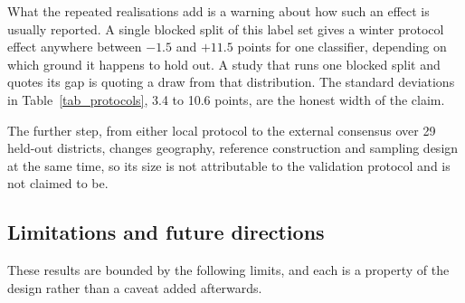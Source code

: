 \documentclass[conference]{IEEEtran}
\begin{document}
What the repeated realisations add is a warning about how such an effect is usually reported. A single blocked split of this label set gives a winter protocol effect anywhere between $-1.5$ and $+11.5$ points for one classifier, depending on which ground it happens to hold out. A study that runs one blocked split and quotes its gap is quoting a draw from that distribution. The standard deviations in Table~\ref{tab_protocols}, 3.4 to 10.6 points, are the honest width of the claim.

The further step, from either local protocol to the external consensus over 29 held-out districts, changes geography, reference construction and sampling design at the same time, so its size is not attributable to the validation protocol and is not claimed to be.

\subsection{Limitations and future directions}
\label{sec:limits}
These results are bounded by the following limits, and each is a property of the design rather than a caveat added afterwards.
\end{document}
